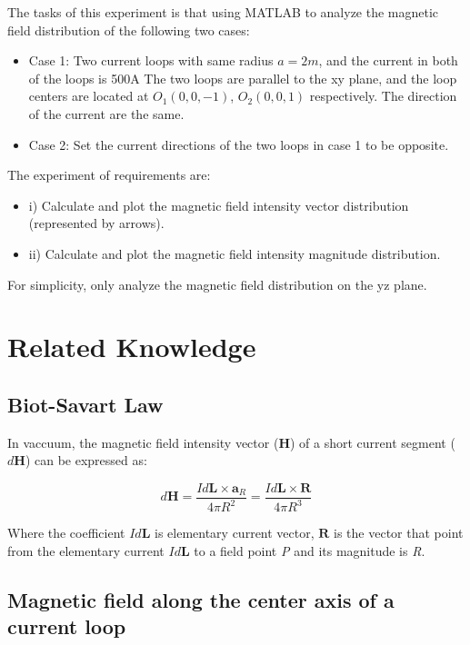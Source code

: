 \documentclass[10pt, journal, final]{IEEEtran}
\begin{document}
The tasks of this experiment is that using MATLAB
to analyze the magnetic field distribution of the following two cases:
\begin{itemize}
    \item Case 1: Two current loops with same radius $a = 2 m$, and the current in both of the loops is 500A
          The two loops are parallel to the xy plane, and the loop centers are located
          at $O_1(0,0,-1)$, $O_2(0,0,1)$ respectively. The direction of the current are the same.
    \item Case 2: Set the current directions of the two loops in case 1 to be opposite.
\end{itemize}
The experiment of requirements are:
\begin{itemize}
    \item i) Calculate and plot the magnetic field intensity vector distribution (represented by arrows).
    \item ii) Calculate and plot the magnetic field intensity magnitude distribution.
\end{itemize}
For simplicity, only analyze the magnetic field distribution on the yz plane.

\section{
  Related Knowledge
 }
\label{sec:Related}

\subsection{
    Biot-Savart Law
}
\label{subsec:Biot-Savart}
In vaccuum, the magnetic field intensity vector ($\mathbf{H}$)
of a short current segment ($d \mathbf{H}$) can be expressed as:

\begin{equation}
    d\mathbf{H} = \frac{I d\mathbf{L} \times \mathbf{a}_{R} }{4 \pi R^2}
    = \frac{I d\mathbf{L} \times \mathbf{R}}{4 \pi R^3}
\end{equation}
\label{eq:Biot-Savart}

Where the coefficient $I d \mathbf{L}$ is elementary current vector,
$\mathbf{R}$ is the vector that point from the elementary current $I d \mathbf{L}$
to a field point \emph{P} and its magnitude is \emph{R}.\par

\subsection{
    Magnetic field along the center axis of a current loop
}
\label{subsec: center of loop}
\end{document}
